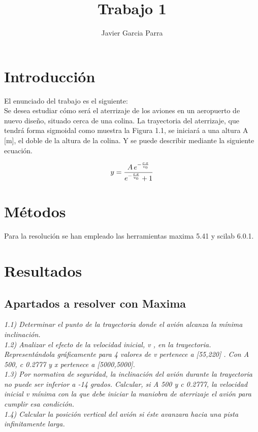 \documentclass[fleqn,10pt]{wlscirep}
\title{Trabajo 1}
\author[50201633Q / jgarcia1285 ]{Javier Garcia Parra}
\begin{document}
\flushbottom
\maketitle
%
%
\thispagestyle{empty}


\section{Introducción}\label{introducciuxf3n}

El enunciado del trabajo es el siguiente:\\
Se desea estudiar cómo será el aterrizaje de los aviones en un
aeropuerto de nuevo diseño, situado cerca de una colina. La trayectoria
del aterrizaje, que tendrá forma sigmoidal como muestra la Figura 1.1,
se iniciará a una altura A {[}m{]}, el doble de la altura de la colina.
Y se puede describir mediante la siguiente ecuación.

\[y={{A\,e^ {- {{c\,x}\over{v_{0}}} }}\over{e^ {- {{c\,x}\over{v_{0}}} }+1}}\]

\section{Métodos}\label{muxe9todos}

Para la resolución se han empleado las herramientas maxima 5.41 y scilab
6.0.1.

\section{Resultados}\label{resultados}

\subsection{Apartados a resolver con
Maxima}\label{apartados-a-resolver-con-maxima}

\emph{1.1) Determinar el punto de la trayectoria donde el avión alcanza
la mínima inclinación.\\
1.2) Analizar el efecto de la velocidad inicial, v , en la trayectoria.
Representándola gráficamente para 4 valores de v pertenece a
{[}55,220{]} . Con A 500, c 0.2777 y x pertenece a {[}5000,5000{]}.\\
1.3) Por normativa de seguridad, la inclinación del avión durante la
trayectoria no puede ser inferior a -14 grados. Calcular, si A 500 y c
0.2777, la velocidad inicial v mínima con la que debe iniciar la
maniobra de aterrizaje el avión para cumplir esa condición.\\
1.4) Calcular la posición vertical del avión si éste avanzara hacia una
pista infinitamente larga.}
\end{document}
